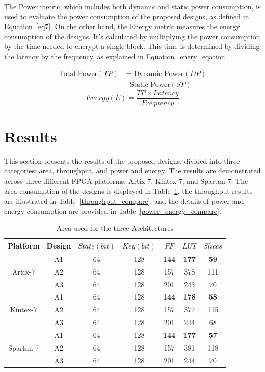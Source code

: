 \documentclass[final,5p,times,twocolumn]{elsarticle}
\begin{document}
The Power metric, which includes both dynamic and static power consumption, is used to evaluate the power consumption of the proposed designs, as defined in Equation~\ref{eq7}.
On the other hand, the Energy metric measures the energy consumption of the designs. It's calculated by multiplying the power consumption by the time needed to encrypt a single block. This time is determined by dividing the latency by the frequency, as explained in Equation~\ref{enery_eqation}.

\begin{align}
    \text{Total Power} (TP) & = \text{Dynamic Power} (DP) \nonumber \\
                            & + \text{Static Power} (SP)
    \label{eq7}
\end{align}
\begin{equation}
    Energy(E) = \frac{TP \times Latency }{Frequency}
    \label{enery_eqation}
\end{equation}


\section{Results}\label{sec5}

This section presents the results of the proposed designs, divided into three categories: area, throughput, and power and energy. The results are demonstrated across three different FPGA platforms: Artix-7, Kintex-7, and Spartan-7. The area consumption of the designs is displayed in Table~\ref{area_compare}, the throughput results are illustrated in Table~\ref{throughput_compare}, and the details of power and energy consumption are provided in Table~\ref{power_energy_compare}.


\begin{table}[h]
    \caption{Area used for the three Architectures}\label{area_compare}%
    \begin{tabular*}{\textwidth}{@{\extracolsep\fill}|c|c|c|c|c|c|c|}
        \hline
        Platform & Design & $State(bit)$ & $Key(bit)$ & $FF$ & $LUT$ & $Slices$ \\
        \hline
        \multirow{3}{*}{Artix-7}  & A1 & 64 & 128 & \textbf{144} & \textbf{177} & \textbf{59} \\
        & A2 & 64 & 128 & 157 & 378 & 111 \\
        & A3 & 64 & 128 & 201 & 243 & 70 \\
        \hline
        \multirow{3}{*}{Kintex-7} & A1 & 64 & 128 & \textbf{144} & \textbf{178} & \textbf{58}\\
        & A2 & 64 & 128 & 157 & 377 & 115 \\
        & A3 & 64 & 128 & 201 & 244 & 68 \\
        \hline
        \multirow{3}{*}{Spartan-7} & A1 & 64 & 128 & \textbf{144} & \textbf{177} & \textbf{57}\\
        & A2 & 64 & 128 & 157 & 381 & 118 \\
        & A3 & 64 & 128 & 201 & 244 & 70 \\
        \hline
    \end{tabular*}
\end{table}
\end{document}
